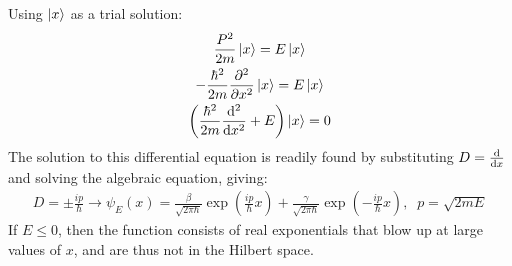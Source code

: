 \documentclass{report}
\theoremstyle{definition}
\begin{document}
\begin{chapter5}\label{prob: 2}
	Using $\ket x$ as a trial solution:
		\begin{gather*}
			\frac{P^2}{2m}\ket{x} = E\ket{x} \\
			-\frac{\hbar^2}{2m}\pdv[2]{x}\ket{x} = E\ket{x} \\
			\pqty{\frac{\hbar^2}{2m}\dv[2]{x} + E}\ket{x} = 0
		\end{gather*}
		The solution to this differential equation is readily found by substituting $D = \dv{x}$ and solving the algebraic equation, giving:
		\begin{gather*}
			D = \pm \frac{ip}{\hbar} \longrightarrow \psi_E(x) = \frac{\beta}{\sqrt{2\pi\hbar}}\exp(\frac{ip}{\hbar}x) + \frac{\gamma}{\sqrt{2\pi\hbar}}\exp(-\frac{ip}{\hbar}x), \;\; p = \sqrt{2mE}
		\end{gather*}
		If $E \leq 0$, then the function consists of real exponentials that blow up at large values of $x$, and are thus not in the Hilbert space.
\end{chapter5}
\end{document}
